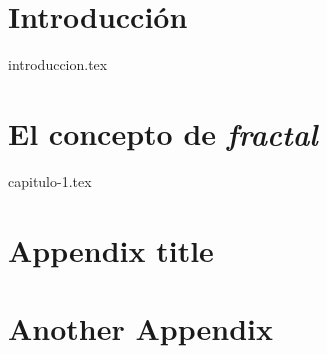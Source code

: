 \documentclass[11pt]{report}
\begin{document}
\chapter*{Introducción}
\setcounter{page}{1}


{introduccion.tex}


\chapter{El concepto de \textit{fractal}}
\label{chap:concepto}

{capitulo-1.tex}







\appendix
\cleardoublepage


\chapter{Appendix title}

\chapter{Another Appendix}
\end{document}
